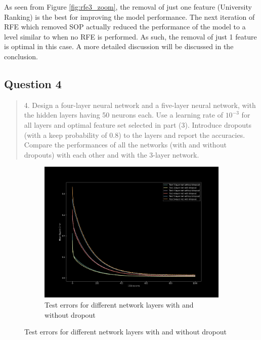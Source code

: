 As seen from Figure \ref{fig:rfe3_zoom}, the removal of just one feature (University Ranking) is the best for improving the model performance. The next iteration of RFE which removed SOP actually reduced the performance of the model to a level similar to when no RFE is performed. As such, the removal of just 1 feature is optimal in this case. A more detailed discussion will be discussed in the conclusion.

\subsection{Question 4}
\label{2q4}
\begin{quote}
4. Design a four-layer neural network and a five-layer neural network, with the hidden layers having 50 neurons each. Use a learning rate of $10^{-3}$ for all layers and optimal feature set selected in part (3). Introduce dropouts (with a keep probability of 0.8) to the layers and report the accuracies. Compare the performances of all the networks (with and without dropouts) with each other and with the 3-layer network.
\end{quote}
\begin{figure}[H]
    \begin{subfigure}{1\textwidth}
        \centering
        \includegraphics[width=0.8\linewidth]{assets/plots2/part4_1.png}
        \caption{Test errors for different network layers with and without dropout}
        \label{fig:2_4_1}
    \end{subfigure}
\end{figure}
